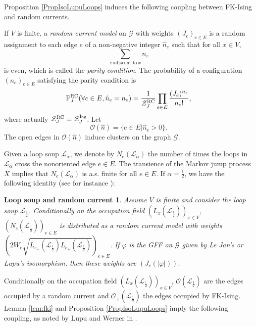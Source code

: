 \documentclass[11pt,a4paper]{amsart}
\numberwithin{equation}{section}
\newtheorem*{LoopsRC}{Loop soup and random current}
\begin{document}
Proposition \ref{PropIsoLupuLoops}  induces the following coupling between FK-Ising and random currents. 

If $V$ is finite, a \textit{random current model} on $\mathcal{G}$ with weights
$(J_{e})_{e\in E}$ is a random assignment to each edge $e$ of a non-negative integer
$\hat{n}_{e}$ such that for all $x\in V$,
\begin{displaymath}
\sum_{e~\text{adjacent to}~x}\hat{n}_{e}
\end{displaymath}
is even, which is called the \textit{parity condition}. The probability of a configuration
$(n_{e})_{e\in E}$ satisfying the parity condition is
\begin{displaymath}
\mathbb{P}^{\rm RC}_{J}(\forall e\in E, \hat{n}_{e}=n_{e})=
\dfrac{1}{\mathcal{Z}^{\rm RC}_{J}}\prod_{e\in E}\dfrac{(J_{e})^{n_{e}}}{n_{e}!},
\end{displaymath}
where actually $\mathcal{Z}^{\rm RC}_{J}=\mathcal{Z}^{\rm Isg}_{J}$. Let
\begin{displaymath}
\mathcal{O}(\hat{n})=\lbrace e\in E\vert \hat{n}_{e}>0\rbrace.
\end{displaymath}
The open edges in $\mathcal{O}(\hat{n})$ induce clusters on the graph $\mathcal{G}$.

Given a loop soup $\mathcal{L}_{\alpha}$, we denote by $N_{e}(\mathcal{L}_{\alpha})$ the number of times the loops in $\mathcal{L}_{\alpha}$ cross the nonoriented edge $e\in E$. The transience of the Markov jump process $X$ implies that
$N_{e}(\mathcal{L}_{\alpha})$ is a.s. finite for all $e\in E$. If $\alpha=\frac{1}{2}$, we have the following identity (see for instance \cite{Werner2015}):

\begin{LoopsRC}
Assume $V$ is finite and consider the loop soup $\mathcal{L}_{\frac{1}{2}}$. Conditionally on the occupation field $(L_{x}(\mathcal{L}_{\frac{1}{2}}))_{x\in V}$, 
$(N_{e}(\mathcal{L}_{\frac{1}{2}}))_{e\in E}$ is distributed as a random current model with weights 
$\left(2W_{e}\sqrt{L_{e_{-}}(\mathcal{L}_{\frac{1}{2}})L_{e_{+}}
(\mathcal{L}_{\frac{1}{2}})}\right)_{e\in E}$. If $\varphi$ is the GFF on $\mathcal{G}$ given by Le Jan's or Lupu's isomorphism, then these weights are
$(J_{e}(\vert\varphi\vert))$.
\end{LoopsRC}

Conditionally on the occupation field 
$(L_{x}(\mathcal{L}_{\frac{1}{2}}))_{x\in V}$, 
$\mathcal{O}(\mathcal{L}_{\frac{1}{2}})$ are the edges occupied by a random current and 
$\mathcal{O}_{+}(\mathcal{L}_{\frac{1}{2}})$ the edges occupied by FK-Ising. 
Lemma \ref{lem:fki} and Proposition \ref{PropIsoLupuLoops} imply the following coupling, as noted by Lupu and Werner in 
\cite{lupu-werner}.
\end{document}
